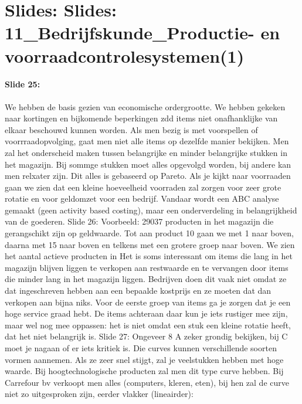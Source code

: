 \documentclass[10pt,a4paper]{report}
\begin{document}
\section{Slides: Slides: 11\_Bedrijfskunde\_Productie- en voorraadcontrolesystemen(1)}

\paragraph{Slide 25:} We hebben de basis gezien van economische ordergrootte. We hebben gekeken naar kortingen en bijkomende beperkingen zdd items niet onafhanklijke van elkaar beschouwd kunnen worden. Als men bezig is met voorspellen of voorrraadopvolging, gaat men niet alle items op dezelfde manier bekijken. Men zal het onderscheid maken tussen belangrijke en minder belangrijke stukken in het magazijn. Bij sommge stukken moet alles opgevolgd worden, bij andere kan men relxater zijn.
Dit alles is gebaseerd op Pareto. Als je kijkt naar voorraaden gaan we zien dat een kleine hoeveelheid voorraden zal zorgen voor zeer grote rotatie en voor geldomzet voor een bedrijf. Vandaar wordt een ABC analyse gemaakt (geen activity based costing), maar een onderverdeling in belangrijkheid van de goederen.
Slide 26: Voorbeeld: 29037 producten in het magazijn die gerangschikt zijn op geldwaarde. Tot aan product 10 gaan we met 1 naar boven, daarna met 15 naar boven en telkens met een grotere groep naar boven. We zien het aantal actieve producten in %
Het is soms interessant om items die lang in het magazijn blijven liggen te verkopen aan restwaarde en te vervangen door items die minder lang in het magazijn liggen. Bedrijven doen dit vaak niet omdat ze dat ingeschreven hebben aan een bepaalde kostprijs en ze moeten dat dan verkopen aan bijna niks.
Voor de eerste groep van items ga je zorgen dat je een hoge service graad hebt. De items achteraan daar kun je iets rustiger mee zijn, maar wel nog mee oppassen: het is niet omdat een stuk een kleine rotatie heeft, dat het niet belangrijk is.
Slide 27: Ongeveer 8%
A zeker grondig bekijken, bij C moet je nagaan of er iets kritiek is.
Die curves kunnen verschillende soorten vormen aannemen. Als ze zeer snel stijgt, zal je veelstukken hebben met hoge waarde. Bij hoogtechnologische producten zal men dit type curve hebben. Bij Carrefour bv verkoopt men alles (computers, kleren, eten), bij hen zal de curve niet zo uitgesproken zijn, eerder vlakker (lineairder):
\end{document}
